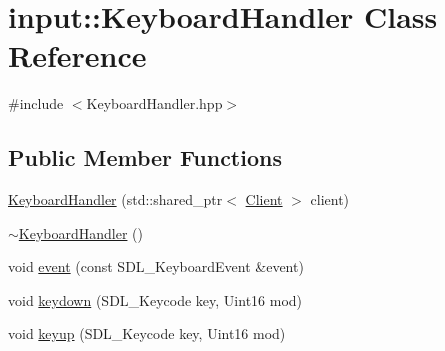 \hypertarget{classinput_1_1KeyboardHandler}{\section{input\-:\-:Keyboard\-Handler Class Reference}
\label{classinput_1_1KeyboardHandler}
}


{\ttfamily \#include $<$Keyboard\-Handler.\-hpp$>$}

\subsection*{Public Member Functions}
\begin{DoxyCompactItemize}
\item 
\hyperlink{classinput_1_1KeyboardHandler_a8e545d84bd57ef646ccb6ac03fc9bb52}{Keyboard\-Handler} (std\-::shared\-\_\-ptr$<$ \hyperlink{classClient}{Client} $>$ client)
\item 
\hyperlink{classinput_1_1KeyboardHandler_acaa63bd1795ed0ad75dcba44bc752ca3}{$\sim$\-Keyboard\-Handler} ()
\item 
void \hyperlink{classinput_1_1KeyboardHandler_a497c9c1ffdf4fc38bb3ae4ba66dfd132}{event} (const S\-D\-L\-\_\-\-Keyboard\-Event \&event)
\item 
void \hyperlink{classinput_1_1KeyboardHandler_ab172551b785dbd8bf823dd6e0e47f3fe}{keydown} (S\-D\-L\-\_\-\-Keycode key, Uint16 mod)
\item 
void \hyperlink{classinput_1_1KeyboardHandler_a25ee5df1b954d3adc76867a8235bf998}{keyup} (S\-D\-L\-\_\-\-Keycode key, Uint16 mod)
\end{DoxyCompactItemize}


